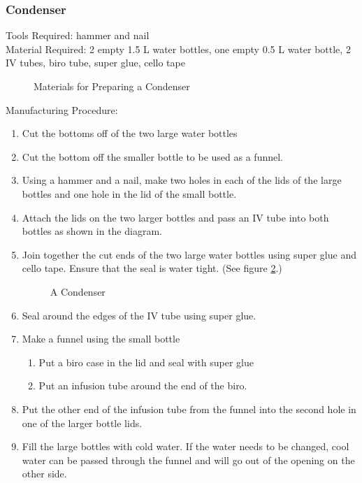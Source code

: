 \subsubsection*{Condenser}
Tools Required: hammer and nail\\
Material Required: 2 empty 1.5 L water bottles, one empty 0.5 L water bottle, 2 IV tubes, biro tube, super glue, cello tape\\
\begin{figure}[h!]
\begin{center}
\def\svgwidth{200pt}

\caption{Materials for Preparing a Condenser}
\label{fig:condenser-materials}
\end{center}
\end{figure}
Manufacturing Procedure:
\begin{enumerate}
\item{Cut the bottoms off of the two large water bottles}
\item{Cut the bottom off the smaller bottle to be used as a funnel.}
\item{Using a hammer and a nail, make two holes in each of the lids of the large bottles and one hole in the lid of the small bottle.}
\item{Attach the lids on the two larger bottles and pass an IV tube into both bottles as shown in the diagram.}
\item {Join together the cut ends of the two large water bottles using super glue and cello tape. Ensure that the seal is water tight. (See figure \ref{fig:condenser}.)}
\begin{figure}[h!]
\begin{center}
\def\svgwidth{350pt}

\caption{A Condenser}
\label{fig:condenser}
\end{center}
\end{figure}
\item {Seal around the edges of the IV tube using super glue.}
\item {Make a funnel using the small bottle}
\begin{enumerate}
 \item {Put a biro case in the lid and seal with super glue}
 \item{Put an infusion tube around the end of the biro.}
\end{enumerate}
\item{Put the other end of the infusion tube from the funnel into the second hole in one of the larger bottle lids.}
\item{Fill the large bottles with cold water. If the water needs to be changed, cool water can be passed through the funnel and will go out of the opening on the other side.}
\end{enumerate}





